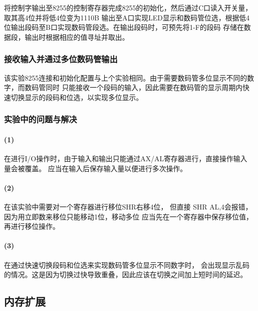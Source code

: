 \documentclass[12pt, a4paper, oneside]{ctexart}
\begin{document}
    将控制字输出至8255的控制寄存器完成8255的初始化，然后通过C口读入开关量，取其高4位并将低4位变为1110B
    输出至A口实现LED显示和数码管位选，根据低4位输出段码至B口实现数码管段选。在输出段码时，可预先将1-F的段码
    存储在数据段，输出时根据相应的值寻址并取出。


    \subsubsection{接收输入并通过多位数码管输出}
    该实验8255连接和初始化配置与上个实验相同。由于需要数码管多位显示不同的数字，而数码管同时
    只能接收一个段码的输入，因此需要在数码管的显示周期内快速切换显示的段码和位选，以实现多位显示。

    \subsubsection{实验中的问题与解决}
    \paragraph{(1)} 在进行I/O操作时，由于输入和输出只能通过AX/AL寄存器进行，直接操作输入量会被覆盖。
    应当在输入后保存输入量以便进行多次操作。

    \paragraph{(2)} 在该实验中需要对一个寄存器进行移位SHR右移4位，
    但直接 SHR AL,4会报错，因为用立即数来移位只能移动1位，移动多位
    应当先在一个寄存器中保存移位值，再进行移位操作。

    \paragraph{(3)} 在通过快速切换段码和位选来实现数码管多位显示不同数字时，
    会出现显示乱码的情况。这是因为切换过快导致重叠，因此应该在切换之间加上短时间的延迟。


    

    \subsection{内存扩展}
\end{document}
